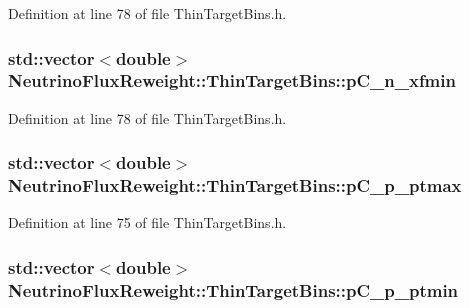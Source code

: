 Definition at line 78 of file Thin\-Target\-Bins.\-h.

\hypertarget{class_neutrino_flux_reweight_1_1_thin_target_bins_adf9a4dab8c39079f18ecdb6670bf9328}{
\subsubsection[{p\-C\-\_\-n\-\_\-xfmin}]{\setlength{\rightskip}{0pt plus 5cm}std\-::vector$<$double$>$ Neutrino\-Flux\-Reweight\-::\-Thin\-Target\-Bins\-::p\-C\-\_\-n\-\_\-xfmin}}\label{class_neutrino_flux_reweight_1_1_thin_target_bins_adf9a4dab8c39079f18ecdb6670bf9328}


Definition at line 78 of file Thin\-Target\-Bins.\-h.

\hypertarget{class_neutrino_flux_reweight_1_1_thin_target_bins_a5b942ecd3723fb8ec06420082b9861af}{
\subsubsection[{p\-C\-\_\-p\-\_\-ptmax}]{\setlength{\rightskip}{0pt plus 5cm}std\-::vector$<$double$>$ Neutrino\-Flux\-Reweight\-::\-Thin\-Target\-Bins\-::p\-C\-\_\-p\-\_\-ptmax}}\label{class_neutrino_flux_reweight_1_1_thin_target_bins_a5b942ecd3723fb8ec06420082b9861af}


Definition at line 75 of file Thin\-Target\-Bins.\-h.

\hypertarget{class_neutrino_flux_reweight_1_1_thin_target_bins_ad17062da0ad8790552e66617d0fc0067}{
\subsubsection[{p\-C\-\_\-p\-\_\-ptmin}]{\setlength{\rightskip}{0pt plus 5cm}std\-::vector$<$double$>$ Neutrino\-Flux\-Reweight\-::\-Thin\-Target\-Bins\-::p\-C\-\_\-p\-\_\-ptmin}}\label{class_neutrino_flux_reweight_1_1_thin_target_bins_ad17062da0ad8790552e66617d0fc0067}


